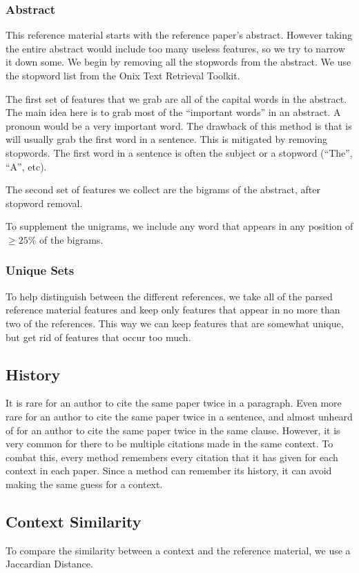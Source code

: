 \documentclass[10pt, conference, compsocconf]{IEEEtran}
\begin{document}
\subsubsection{Abstract}
This reference material starts with the reference paper's abstract. However taking the entire abstract would include too many
useless features, so we try to narrow it down some. We begin by removing all the stopwords from the abstract. We use
the stopword list from the Onix Text Retrieval Toolkit\cite{stopwords}.

The first set of features that we grab are all of the capital words in the abstract. The main idea here is to grab
most of the ``important words'' in an abstract. A pronoun would be a very important word. The drawback of this method is that
is will usually grab the first word in a sentence. This is mitigated by removing stopwords. The first word in a sentence
is often the subject or a stopword (``The'', ``A'', etc).

The second set of features we collect are the bigrams of the abstract, after stopword removal.

To supplement the unigrams, we include any word that appears in any position of $\geq25\%$ of the bigrams.

\subsubsection{Unique Sets}
To help distinguish between the different references, we take all of the parsed reference material features and
keep only features that appear in no more than two of the references. This way we can keep features that are somewhat
unique, but get rid of features that occur too much.

\subsection{History}
It is rare for an author to cite the same paper twice in a paragraph. Even more rare for
an author to cite the same paper twice in a sentence, and almost unheard of for an author to cite the
same paper twice in the same clause. However, it is very common for there to be multiple citations
made in the same context. To combat this, every method remembers every citation that it has given
for each context in each paper. Since a method can remember its history, it can avoid making the
same guess for a context.

\subsection{Context Similarity}
To compare the similarity between a context and the reference material, we use a Jaccardian Distance\cite{jaccard}.
\end{document}
